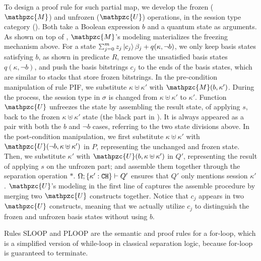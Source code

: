 To design a proof rule for such partial map, we develop the frozen ($\mathpzc{M}$) and unfrozen ($\mathpzc{U}$) operations, in the session type category (). Both take a Boolean expression $b$ and a quantum state as arguments. As shown on top of , $\mathpzc{M}$'s modeling materializes the freezing mechanism above. For a state $\scha{m}{z_j}{c_{j}}{\beta_j}+q(\kappa,\neg b)$, we only keep basis states satisfying $b$, as shown in predicate $R$, remove the unsatisfied basis states $q(\kappa,\neg b)$, and push the basis bitstrings $c_{j}$ to the ends of the basis states, which are similar to stacks that store frozen bitstrings.
In the pre-condition manipulation of rule \textsc{PIF}, we substitute $\kappa \uplus \kappa'$ with $\mathpzc{M}(b,\kappa')$. During the process, the session type in $\sigma$ is changed from $\kappa \uplus \kappa'$ to $\kappa'$.
Function $\mathpzc{U}$ unfreezes the state by assembling the result state, of applying $s$, back to the frozen $\kappa \uplus \kappa'$ state (the black part in ). It is always appeared as a pair with both the $b$ and $\neg b$ cases, referring to the two state divisions above. In the post-condition manipulation, we first substitute $\kappa \uplus \kappa'$ with $\mathpzc{U}(\neg b,\kappa \uplus \kappa')$ in $P$, representing the unchanged and frozen state. Then, we substitute $\kappa'$ with $\mathpzc{U}(b,\kappa \uplus \kappa')$ in $Q'$, representing the result of applying $s$ on the unfrozen part; and assemble them together through the separation operation $*$. 
$\Omega;\{\kappa' : \texttt{CH}\} \vdash Q'$ ensures that $Q'$ only mentions session $\kappa'$.
$\mathpzc{U}$'s modeling in the first line of  captures the assemble procedure by merging two $\mathpzc{U}$ constructs together. Notice that $c_{j}$ appears in two $\mathpzc{U}$ constructs, meaning that we actually utilize $c_j$ to distinguish the frozen and unfrozen basis states without using $b$.

Rules \textsc{SLOOP} and \textsc{PLOOP} are the semantic and proof rules for a for-loop, which is a simplified version of while-loop in classical separation logic, because for-loop is guaranteed to terminate.

